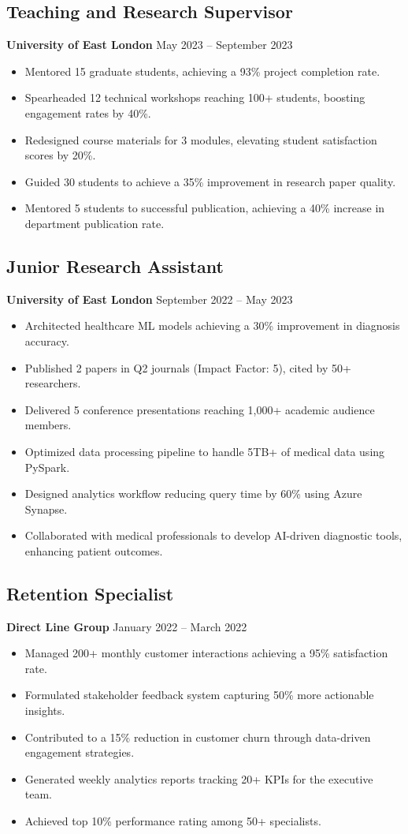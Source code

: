 \documentclass[10pt,a4paper]{article}
\begin{document}
\subsection*{Teaching and Research Supervisor}
\textbf{University of East London} \hfill May 2023 -- September 2023
\begin{itemize}
    \item Mentored 15 graduate students, achieving a 93\% project completion rate.
    \item Spearheaded 12 technical workshops reaching 100+ students, boosting engagement rates by 40\%.
    \item Redesigned course materials for 3 modules, elevating student satisfaction scores by 20\%.
    \item Guided 30 students to achieve a 35\% improvement in research paper quality.
    \item Mentored 5 students to successful publication, achieving a 40\% increase in department publication rate.
\end{itemize}

\subsection*{Junior Research Assistant}
\textbf{University of East London} \hfill September 2022 -- May 2023
\begin{itemize}
    \item Architected healthcare ML models achieving a 30\% improvement in diagnosis accuracy.
    \item Published 2 papers in Q2 journals (Impact Factor: 5), cited by 50+ researchers.
    \item Delivered 5 conference presentations reaching 1,000+ academic audience members.
    \item Optimized data processing pipeline to handle 5TB+ of medical data using PySpark.
    \item Designed analytics workflow reducing query time by 60\% using Azure Synapse.
    \item Collaborated with medical professionals to develop AI-driven diagnostic tools, enhancing patient outcomes.
\end{itemize}

\subsection*{Retention Specialist}
\textbf{Direct Line Group} \hfill January 2022 -- March 2022
\begin{itemize}
    \item Managed 200+ monthly customer interactions achieving a 95\% satisfaction rate.
    \item Formulated stakeholder feedback system capturing 50\% more actionable insights.
    \item Contributed to a 15\% reduction in customer churn through data-driven engagement strategies.
    \item Generated weekly analytics reports tracking 20+ KPIs for the executive team.
    \item Achieved top 10\% performance rating among 50+ specialists.
\end{itemize}
\end{document}
